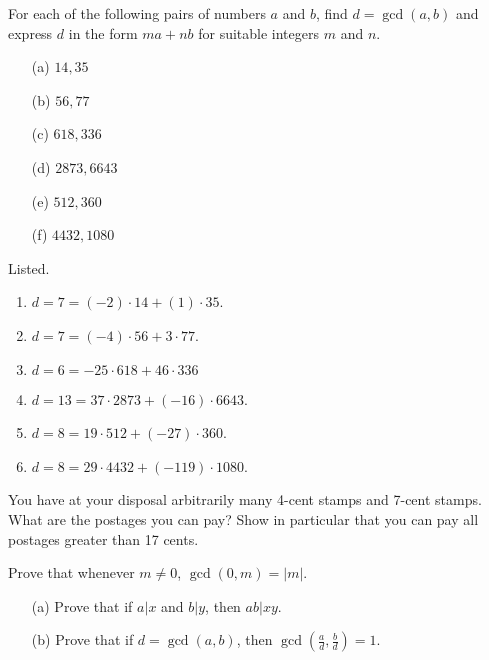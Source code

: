   \begin{exercise}[Shifrin 1.2.1]
    For each of the following pairs of numbers $a$ and $b$, find $d = \gcd(a,b)$ and express $d$ in the form $ma+nb$ for suitable integers $m$ and $n$.
    \begin{enumerate}
      \item[(a)] $14, 35$
      \item[(b)] $56, 77$
      \item[(c)] $618, 336$
      \item[(d)] $2873, 6643$
      \item[(e)] $512, 360$
      \item[(f)] $4432, 1080$
    \end{enumerate}
  \end{exercise}
  \begin{solution}
    Listed. 
    \begin{enumerate}
      \item $d = 7 = (-2) \cdot 14 + (1) \cdot 35$. 
      \item $d = 7 = (-4) \cdot 56 + 3 \cdot 77$. 
      \item $d = 6 = -25 \cdot 618 + 46 \cdot 336$ 
      \item $d = 13 = 37 \cdot 2873 + (-16) \cdot 6643$. 
      \item $d = 8 = 19 \cdot 512 + (-27) \cdot 360$. 
      \item $d = 8 = 29 \cdot 4432 + (-119) \cdot 1080$. 
    \end{enumerate}
  \end{solution}

  \begin{exercise}[Shifrin 1.2.2]
    You have at your disposal arbitrarily many 4-cent stamps and 7-cent stamps. What are the postages you can pay? Show in particular that you can pay all postages greater than 17 cents.
  \end{exercise}

  \begin{exercise}[Shifrin 1.2.3]
    Prove that whenever $m \neq 0$, $\gcd(0, m) = |m|$.
  \end{exercise}

  \begin{exercise}[Shifrin 1.2.4]
    \begin{enumerate}
      \item[(a)] Prove that if $a|x$ and $b|y$, then $ab|xy$.
      \item[(b)] Prove that if $d = \gcd(a, b)$, then $\gcd(\frac{a}{d}, \frac{b}{d}) = 1$.
    \end{enumerate}
  \end{exercise}

